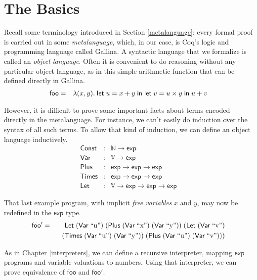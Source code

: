 \documentclass{amsbook}
\theoremstyle{definition}
\theoremstyle{remark}
\numberwithin{section}{chapter}
\numberwithin{equation}{chapter}
\begin{document}
\section{The Basics}

Recall some terminology introduced in Section \ref{metalanguage}: every formal proof is carried out in some \emph{metalanguage}, which, in our case, is Coq's logic and programming language called Gallina.
A syntactic language that we formalize is called an \emph{object language}.
Often it is convenient to do reasoning without any particular object language, as in this simple arithmetic function that can be defined directly in Gallina.
\newcommand{\mt}[1]{\mathsf{#1}}
\begin{eqnarray*}
  \mt{foo} &=& \lambda(x, y). \; \elet{u}{x + y}{\elet{v}{u \times y}{u + v}}
\end{eqnarray*}

However, it is difficult to prove some important facts about terms encoded directly in the metalanguage.
For instance, we can't easily do induction over the syntax of all such terms.
To allow that kind of induction, we can define an object language inductively.
\encoding
\begin{eqnarray*}
  \mt{Const} &:& \mathbb N \to \mt{exp} \\
  \mt{Var} &:& \mathbb V \to \mt{exp} \\
  \mt{Plus} &:& \mt{exp} \to \mt{exp} \to \mt{exp} \\
  \mt{Times} &:& \mt{exp} \to \mt{exp} \to \mt{exp} \\
  \mt{Let} &:& \mathbb V \to \mt{exp} \to \mt{exp} \to \mt{exp}
\end{eqnarray*}

That last example program, with implicit \emph{free variables} $x$ and $y$, may now be redefined in the $\mt{exp}$ type.
\newcommand{\var}[1]{\mt{Var} \; \textrm{``#1''}}
\begin{eqnarray*}
  \mt{foo'} &=& \mt{Let} \; (\var{u}) \; (\mt{Plus} \; (\var{x}) \; (\var{y})) \; (\mt{Let} \; (\var{v}) \\
  && \hspace{.1in} (\mt{Times} \; (\var{u}) \; (\var{y})) \; (\mt{Plus} \; (\var{u}) \; (\var{v})))
\end{eqnarray*}

As in Chapter \ref{interpreters}, we can define a recursive interpreter, mapping $\mt{exp}$ programs and variable valuations to numbers.
Using that interpreter, we can prove equivalence of $\mt{foo}$ and $\mt{foo'}$.
\end{document}
